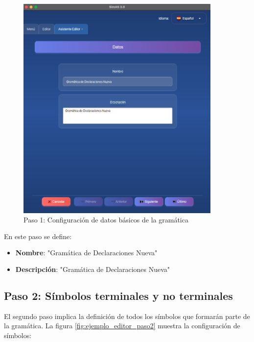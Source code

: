 \needspace{8cm}
\begin{figure}[H]
    \centering
    \includegraphics[width=0.9\textwidth]{figuras/ejemplo_practico/editor_paso1.png}
    \caption{Paso 1: Configuración de datos básicos de la gramática}
    \label{fig:ejemplo_editor_paso1}
\end{figure}

En este paso se define:
\begin{itemize}
    \item \textbf{Nombre}: \string"Gramática de Declaraciones Nueva\string"
    \item \textbf{Descripción}: \string"Gramática de Declaraciones Nueva\string"
\end{itemize}

\subsection{Paso 2: Símbolos terminales y no terminales}

El segundo paso implica la definición de todos los símbolos que formarán parte de la gramática. La figura \ref{fig:ejemplo_editor_paso2} muestra la configuración de símbolos:

